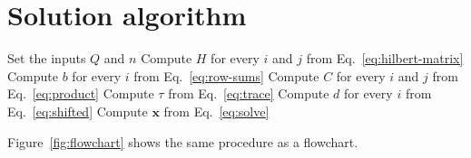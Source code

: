 \section{Solution algorithm}
\begin{algorithm}[htbp]
  \caption{Solution procedure}\label{alg:solution}
  \begin{algorithmic}[1]
    \State Set the inputs $Q$ and $n$
    \State Compute $H$ for every $i$ and $j$ from Eq.~\eqref{eq:hilbert-matrix}
    \State Compute $b$ for every $i$ from Eq.~\eqref{eq:row-sums}
    \State Compute $C$ for every $i$ and $j$ from Eq.~\eqref{eq:product}
    \State Compute $\tau$ from Eq.~\eqref{eq:trace}
    \State Compute $d$ for every $i$ from Eq.~\eqref{eq:shifted}
    \State Compute $\mathbf{x}$ from Eq.~\eqref{eq:solve}
  \end{algorithmic}
\end{algorithm}

Figure~\ref{fig:flowchart} shows the same procedure as a flowchart.

